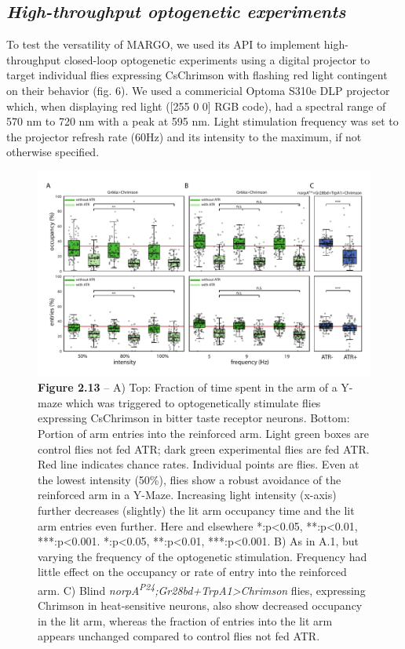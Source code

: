 \documentclass[12pt,letterpaper]{article}
\begin{document}
\subsection*{\textit{High-throughput optogenetic experiments}}

To test the versatility of MARGO, we used its API to implement high-throughput closed-loop optogenetic experiments using a digital projector to target individual flies expressing CsChrimson \cite{griebel_2014,Klapoetke_Independent_2014} with flashing red light contingent on their behavior (fig. 6). We used a commericial Optoma S310e DLP projector which, when displaying red light ([255 0 0] RGB code), had a spectral range of 570 nm to 720 nm with a peak at 595 nm. Light stimulation frequency was set to the projector refresh rate (60Hz) and its intensity to the maximum, if not otherwise specified.

\begin{figure}[t!]
 \includegraphics[width=\textwidth]{../figures/chapter_2/fig_2-13.pdf}
 \caption*{\textbf{Figure 2.13} --  A) Top: Fraction of time spent in the arm of a Y-maze which was triggered to optogenetically stimulate flies expressing CsChrimson in bitter taste receptor neurons. Bottom: Portion of arm entries into the reinforced arm. Light green boxes are control flies not fed ATR; dark green experimental flies are fed ATR. Red line indicates chance rates. Individual points are flies. Even at the lowest intensity (50\%), flies show a robust avoidance of the reinforced arm in a Y-Maze. Increasing light intensity (x-axis) further decreases (slightly) the lit arm occupancy time and the lit arm entries even further. Here and elsewhere *:p<0.05, **:p<0.01, ***:p<0.001. *:p<0.05, **:p<0.01, ***:p<0.001. B) As in A.1, but varying the frequency of the optogenetic stimulation. Frequency had little effect on the occupancy or rate of entry into the reinforced arm. C) Blind \textit{norpA\textsuperscript{P24};Gr28bd+TrpA1>Chrimson} flies, expressing Chrimson in heat-sensitive neurons, also show decreased occupancy in the lit arm, whereas the fraction of entries into the lit arm appears unchanged compared to control flies not fed ATR. 
}
\end{figure}
\end{document}
